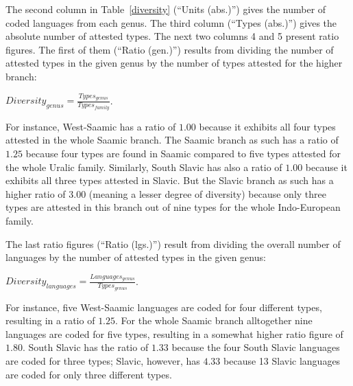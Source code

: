 The second column in Table~\ref{diversity} (“Units (abs.)”) gives the number of coded languages from each genus. The third column (“Types (abs.)”) gives the absolute number of attested types. The next two columns 4 and 5 present ratio figures. The first of them (“Ratio (gen.)”) results from dividing the number of attested types in the given genus by the number of types attested for the higher branch:\medskip

$Diversity_{genus} = \frac{Types_{genus}}{Types_{family}}$.\medskip

\noindent For instance, West-Saamic has a ratio of $1.00$ because it exhibits all four types attested in the whole Saamic branch. The Saamic branch as such has a ratio of $1.25$ because four types are found in Saamic compared to five types attested for the whole Uralic family. Similarly, South Slavic has also a ratio of $1.00$ because it exhibits all three types attested in Slavic. But the Slavic branch as such has a higher ratio of $3.00$ (meaning a lesser degree of diversity) because only three types are attested in this branch out of nine types for the whole Indo-European family. 

The last ratio figures (“Ratio (lgs.)”) result from dividing the overall number of languages by the number of attested types in the given genus:\medskip

$Diversity_{languages} = \frac{Languages_{genus}}{Types_{genus}}$.\medskip

\noindent For instance, five West-Saamic languages are coded for four different types, resulting in a ratio of $1.25$. For the whole Saamic branch alltogether nine languages are coded for five types, resulting in a somewhat higher ratio figure of $1.80$. South Slavic has the ratio of $1.33$ because the four South Slavic languages are coded for three types; Slavic, however, has $4.33$ because 13 Slavic languages are coded for only three different types.

